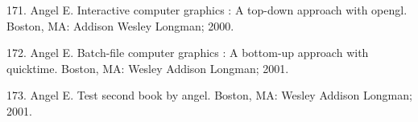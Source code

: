 \documentclass[12pt,twoside]{reedthesis}
\begin{document}
  \hypertarget{ref-angel2000}{}
  171. Angel E. Interactive computer graphics : A top-down approach with
  opengl. Boston, MA: Addison Wesley Longman; 2000.
  
  \hypertarget{ref-angel2001}{}
  172. Angel E. Batch-file computer graphics : A bottom-up approach with
  quicktime. Boston, MA: Wesley Addison Longman; 2001.
  
  \hypertarget{ref-angel2002a}{}
  173. Angel E. Test second book by angel. Boston, MA: Wesley Addison
  Longman; 2001.


\end{document}
